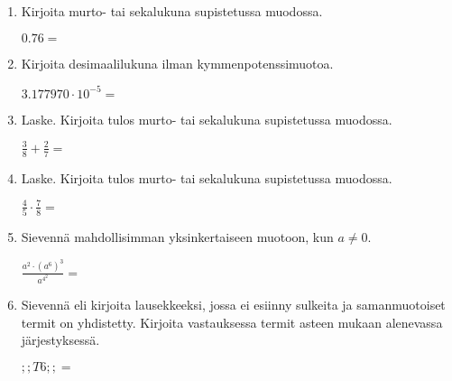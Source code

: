 \documentclass[finnish, a4paper, 12pt]{article}
\begin{document}
	\begin{enumerate}[leftmargin=*]
		\setlength\itemsep{1em}
		
		\item %
		Kirjoita murto- tai sekalukuna supistetussa muodossa. 
		
		\(
		0.76 = 
		\) %
		
		\vspace{8pt}
		
		\item %
		Kirjoita desimaalilukuna ilman kymmenpotenssimuotoa. 
		
		\(
		3.177970\cdot 10^{-5} = 
		\) %
		
		\vspace{8pt}
		
		\item %
		Laske. Kirjoita tulos murto- tai sekalukuna supistetussa muodossa.
		
		\(
		\displaystyle
		\frac{3}{8}+\frac{2}{7} = 
		\) %
		
		\vspace{8pt}
		
		\item %
		Laske. Kirjoita tulos murto- tai sekalukuna supistetussa muodossa.
		
		\(
		\displaystyle
		\frac{4}{5}\cdot\frac{7}{8} = 
		\) %
		
		\vspace{8pt}
		
		\item %
		Sievennä mahdollisimman yksinkertaiseen muotoon, kun \(a \not = 0\). 
		
		\(
		\displaystyle
		\frac{a^2 \cdot \left(a^6\right)^3}{a^{4^2}} =
		\phantom{mmmmmmmmmmmmmmm}
		\) %
		
		\vspace{8pt}
		
		\item %
		Sievennä eli kirjoita lausekkeeksi, jossa ei esiinny sulkeita ja 
		samanmuotoiset termit on yhdistetty. 
		Kirjoita vastauksessa termit asteen mukaan alenevassa järjestyksessä. 
		
		\(
		\displaystyle
		;;T6;; = 
		\) %
		

\end{enumerate}
\end{document}
